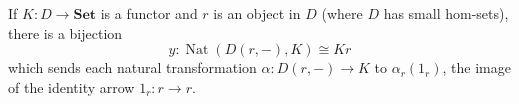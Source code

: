 If $K: D \to \mathbf{Set}$ is a functor and $r$ is an object in $D$ (where $D$ has small hom-sets), there is a bijection
$$y: \operatorname{Nat}(D(r, -), K) \cong Kr$$
which sends each natural transformation $\alpha: D(r, -) \to K$ to $\alpha_r(1_r)$, the image of the identity arrow $1_r: r \to r$.